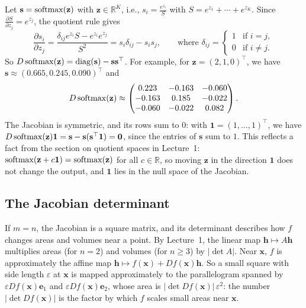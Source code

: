 \begin{example}[Softmax]\label{L3-ex:softmax-jacobian}
    Let $\mathbf{s} = \operatorname{softmax}(\mathbf{z})$ with $\mathbf{z} \in \mathbb{R}^K$, i.e., $s_i = \frac{e^{z_i}}{S}$ with $S = e^{z_1} + \cdots + e^{z_K}$. Since $\frac{\partial S}{\partial z_j} = e^{z_j}$, the quotient rule gives
    \[\frac{\partial s_i}{\partial z_j} = \frac{\delta_{ij} e^{z_i} S - e^{z_i} e^{z_j}}{S^2} = s_i \delta_{ij} - s_i s_j, \qquad \text{where } \delta_{ij} = \begin{cases} 1 & \text{if } i = j, \\ 0 & \text{if } i \neq j. \end{cases}\]
    So $D\operatorname{softmax}(\mathbf{z}) = \operatorname{diag}(\mathbf{s}) - \mathbf{s}\mathbf{s}^\top$. For example, for $\mathbf{z} = (2, 1, 0)^\top$, we have $\mathbf{s} \approx (0.665, 0.245, 0.090)^\top$ and
    \[D\operatorname{softmax}(\mathbf{z}) \approx \begin{pmatrix} 0.223 & -0.163 & -0.060 \\ -0.163 & 0.185 & -0.022 \\ -0.060 & -0.022 & 0.082 \end{pmatrix}.\]
    The Jacobian is symmetric, and its rows sum to $0$: with $\mathbf{1} = (1, \ldots, 1)^\top$, we have $D\operatorname{softmax}(\mathbf{z})\mathbf{1} = \mathbf{s} - \mathbf{s}(\mathbf{s}^\top \mathbf{1}) = \mathbf{0}$, since the entries of $\mathbf{s}$ sum to $1$. This reflects a fact from the section on quotient spaces in Lecture~1: $\operatorname{softmax}(\mathbf{z} + c\mathbf{1}) = \operatorname{softmax}(\mathbf{z})$ for all $c \in \mathbb{R}$, so moving $\mathbf{z}$ in the direction $\mathbf{1}$ does not change the output, and $\mathbf{1}$ lies in the null space of the Jacobian.
\end{example}

\subsection{The Jacobian determinant}

If $m = n$, the Jacobian is a square matrix, and its determinant describes how $f$ changes areas and volumes near a point. By Lecture~1, the linear map $\mathbf{h} \mapsto A\mathbf{h}$ multiplies areas (for $n = 2$) and volumes (for $n \geq 3$) by $|\det A|$. Near $\mathbf{x}$, $f$ is approximately the affine map $\mathbf{h} \mapsto f(\mathbf{x}) + Df(\mathbf{x})\mathbf{h}$. So a small square with side length $\varepsilon$ at $\mathbf{x}$ is mapped approximately to the parallelogram spanned by $\varepsilon Df(\mathbf{x})\mathbf{e}_1$ and $\varepsilon Df(\mathbf{x})\mathbf{e}_2$, whose area is $|\det Df(\mathbf{x})| \, \varepsilon^2$: the number $|\det Df(\mathbf{x})|$ is the factor by which $f$ scales small areas near $\mathbf{x}$.

